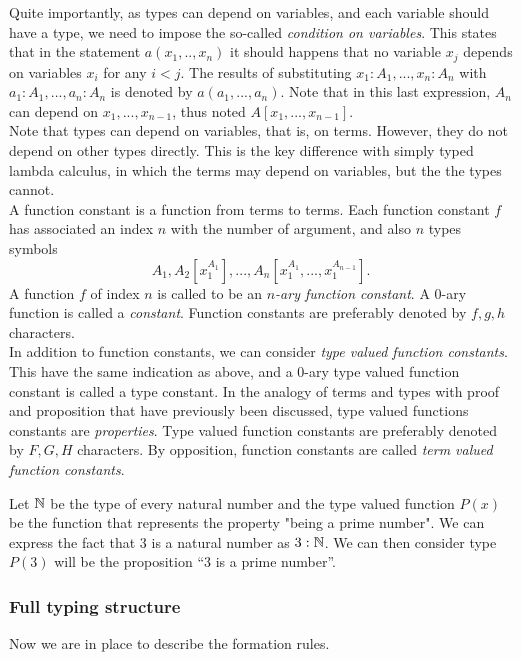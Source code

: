 Quite importantly, as types can depend on variables, and each variable should have a type, we need to impose the so-called \emph{condition on variables}. This states that in the statement $a(x_1,..,x_n)$ it should happens that no variable $x_j$ depends on variables $x_i$ for any $i<j$. The results of substituting $x_1:A_1,...,x_n:A_n$ with $a_1:A_1,...,a_n:A_n$ is denoted by $a(a_1,...,a_n)$. Note that in this last expression, $A_n$ can depend on $x_1,...,x_{n-1}$, thus noted $A[x_1,...,x_{n-1}]$. \\

Note that types can depend on variables, that is, on terms. However, they do not depend on other types directly. This is the key difference with simply typed lambda calculus, in which the terms may depend on variables, but the the types cannot.\\

A function constant is a function from terms to terms. Each function constant $f$ has associated an index $n$ with the number of argument, and also $n$ types symbols $$A_1, A_2[x_1^{A_1}],...,A_n[x_1^{A_1},...,x_1^{A_{n-1}}].$$ A function $f$ of index $n$ is called to be an \emph{$n$-ary function constant}. A 0-ary function is called a \emph{constant}.  Function constants are preferably denoted by $f,g,h$ characters. \\

In addition to function constants, we can consider \emph{type valued function constants}. This have the same indication as above, and a 0-ary type valued function constant is called a type constant. In the analogy of terms and types with proof and proposition that have previously been discussed, type valued functions constants are \emph{properties}. Type valued function constants are preferably denoted by $F,G,H$ characters. By opposition, function constants are called \emph{term valued function constants}.


\begin{example}\label{example:primeML}
  Let $\mathbb{N}$ be the type of every natural number and the type valued function $P(x)$ be the function that represents the property "being a prime number". We can express the fact that 3 is a natural number as $3: \mathbb{N}$. We can then consider  type $P(3)$ will be the proposition ``3 is a prime number''. 
\end{example}

\subsubsection{Full typing structure}
Now we are in place to describe the formation rules.

